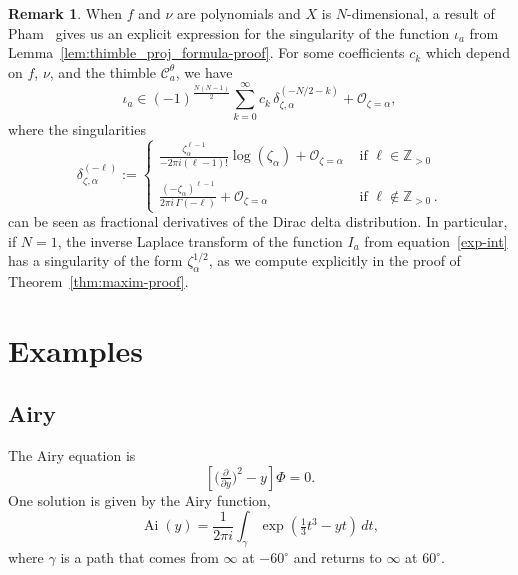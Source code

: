 \documentclass{article}
\newcommand{\Z}{\mathbb{Z}}
\DeclareMathOperator{\Ai}{Ai}
\theoremstyle{definition}
\newtheorem{remark}[definition]{Remark}
\theoremstyle{plain}
\begin{document}
\begin{remark}\label{rmk:Pham formula}
When $f$ and $\nu$ are polynomials and $X$ is $N$-dimensional, a result of Pham~\cite[equation 2.4, II partie]{pham} gives us an explicit expression for the singularity of the function $\iota_a$ from Lemma~\ref{lem:thimble_proj_formula-proof}. For some coefficients $c_k$ which depend on $f$, $\nu$, and the thimble $\mathcal{C}_a^\theta$, we have
\begin{equation}\label{eqn:Pham}
\iota_a \in (-1)^{\frac{N(N-1)}{2}}  \sum_{k=0}^\infty c_k\, \delta_{\zeta, \alpha}^{(-N/2 - k)} + \mathcal{O}_{\zeta = \alpha},
\end{equation}
where the singularities
\begin{equation*}
\delta_{\zeta,\alpha}^{(-\ell)}:=\begin{cases}
\displaystyle\frac{\zeta_\alpha^{\ell-1}}{-2\pi i(\ell-1)!}\log(\zeta_\alpha)+ \mathcal{O}_{\zeta = \alpha} & \text{ if } \ell \in \Z_{> 0}\\
& \\
\displaystyle\frac{(-\zeta_\alpha)^{\ell-1}}{2\pi i\, \Gamma(-\ell)}+ \mathcal{O}_{\zeta = \alpha} & \text{ if } \ell \notin \Z_{> 0} \,.
\end{cases}
\end{equation*}
can be seen as fractional derivatives of the Dirac delta distribution. In particular, if $N=1$, the inverse Laplace transform of the function $I_a$ from equation~\eqref{exp-int} has a singularity of the form $\zeta_\alpha^{1/2}$, as we compute explicitly in the proof of Theorem~\ref{thm:maxim-proof}. %
\end{remark}
\section{Examples}\label{sec:examples}
%
\subsection{Airy}\label{sec:airy}
%
The Airy equation is
\begin{equation}\label{eqn:airy}
\left[\big(\tfrac{\partial}{\partial y}\big)^2 - y\right] \Phi = 0.
\end{equation}
One solution is given by the Airy function,
\[ \Ai(y) = \frac{1}{2\pi i} \int_\gamma \exp\left(\tfrac{1}{3}t^3 - yt\right)\,dt, \]
where $\gamma$ is a path that comes from $\infty$ at $-60^\circ$ and returns to $\infty$ at $60^\circ$.
\end{document}
